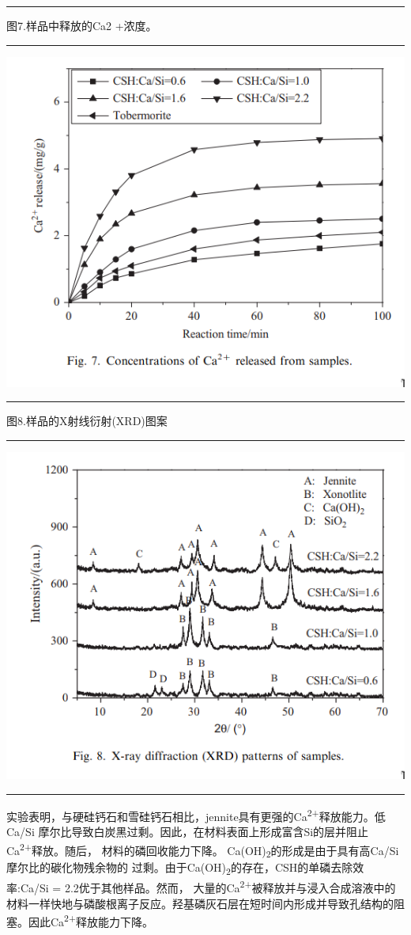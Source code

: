 \documentclass[11pt]{article}
\begin{document}
\noindent\rule{\textwidth}{0.5pt}
图7.样品中释放的Ca2 +浓度。

\noindent\rule{\textwidth}{0.5pt}
\includegraphics[scale=0.5]{fig.7.png}

\noindent\rule{\textwidth}{0.5pt}
图8.样品的X射线衍射(XRD)图案

\noindent\rule{\textwidth}{0.5pt}
\includegraphics[scale=0.5]{fig.8.png}

\noindent\rule{\textwidth}{0.5pt}

实验表明，与硬硅钙石和雪硅钙石相比，jennite具有更强的Ca\textsuperscript{2+}释放能力。低Ca/Si
摩尔比导致白炭黑过剩。因此，在材料表面上形成富含Si的层并阻止Ca\textsuperscript{2+}释放。随后，
材料的磷回收能力下降。 Ca(OH)\textsubscript{2}的形成是由于具有高Ca/Si摩尔比的碳化物残余物的
过剩。由于Ca(OH)\textsubscript{2}的存在，CSH的单磷去除效率:Ca/Si = 2.2优于其他样品。然而，
大量的Ca\textsuperscript{2+}被释放并与浸入合成溶液中的材料一样快地与磷酸根离子反应。羟基磷灰石层在短时间内形成并导致孔结构的阻塞。因此Ca\textsuperscript{2+}释放能力下降。
\end{document}
